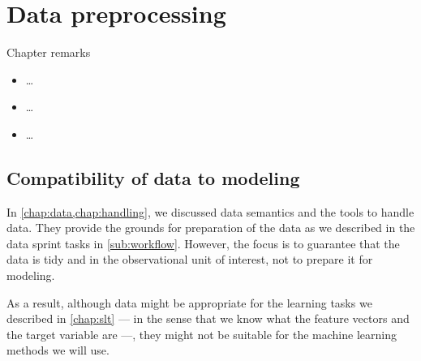 \chapter{Data preprocessing}
\label{chap:preprocess}
\glsresetall


\begin{mainbox}{Chapter remarks}


  \startcontents[chapters]
  \vspace{1em}


  \begin{itemize}
    \itemsep0em
    \item \dots
  \end{itemize}


  \begin{itemize}
    \itemsep0em
    \item \dots
  \end{itemize}


  \begin{itemize}
    \itemsep0em
    \item \dots
  \end{itemize}
\end{mainbox}

{}
\clearpage

\section{Compatibility of data to modeling}

In \cref{chap:data,chap:handling}, we discussed data semantics and the tools to
handle data.  They provide the grounds for preparation of the data as we described in the
data sprint tasks in \cref{sub:workflow}.  However, the focus is to guarantee that the
data is tidy and in the observational unit of interest, not to prepare it for modeling.

As a result, although data might be appropriate for the learning tasks we described in
\cref{chap:slt} --- in the sense that we know what the feature vectors and the target
variable are ---, they might not be suitable for the machine learning methods we will use.

